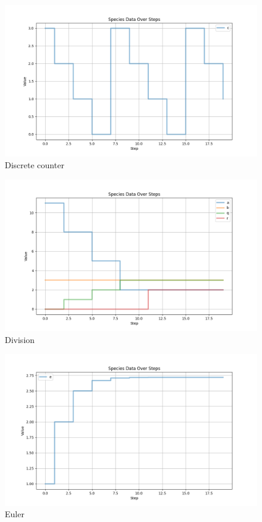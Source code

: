 \begin{figure}[H]
    \centering
    \includegraphics[width=\textwidth]{report/figures/InterpreterPlots/counterInt.png}
    \caption{Discrete counter}
\end{figure}

\begin{figure}[H]
    \centering
    \includegraphics[width=\textwidth]{report/figures/InterpreterPlots/divisionInt.png}
    \caption{Division}
\end{figure}

\begin{figure}[H]
    \centering
    \includegraphics[width=\textwidth]{report/figures/InterpreterPlots/eulerInt.png}
    \caption{Euler}
\end{figure}

